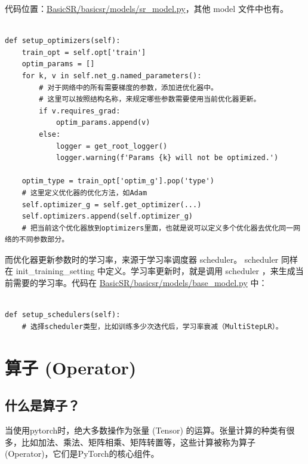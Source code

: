 \documentclass[../main.tex]{subfiles}
\begin{document}
代码位置：\href{https://github.com/XPixelGroup/BasicSR/blob/master/basicsr/models/sr_model.py}{BasicSR/basicsr/models/sr\_model.py}，其他 model 文件中也有。

\begin{verbatim}

def setup_optimizers(self):
    train_opt = self.opt['train']
    optim_params = []
    for k, v in self.net_g.named_parameters():
        # 对于网络中的所有需要梯度的参数，添加进优化器中。
        # 这里可以按照结构名称，来规定哪些参数需要使用当前优化器更新。
        if v.requires_grad:
            optim_params.append(v)
        else:
            logger = get_root_logger()
            logger.warning(f'Params {k} will not be optimized.')

    optim_type = train_opt['optim_g'].pop('type')
    # 这里定义优化器的优化方法，如Adam
    self.optimizer_g = self.get_optimizer(...)
    self.optimizers.append(self.optimizer_g)
    # 把当前这个优化器放到optimizers里面，也就是说可以定义多个优化器去优化同一网络的不同参数部分。
\end{verbatim}

而优化器更新参数时的学习率，来源于学习率调度器 scheduler。 scheduler 同样在 init\_training\_setting 中定义。学习率更新时，就是调用 scheduler ，来生成当前需要的学习率。代码在 \href{https://github.com/XPixelGroup/BasicSR/blob/master/basicsr/models/base_model.py}{BasicSR/basicsr/models/base\_model.py} 中：

\begin{verbatim}

def setup_schedulers(self):
    # 选择scheduler类型，比如训练多少次迭代后，学习率衰减（MultiStepLR）。
\end{verbatim}



\section{算子 (Operator)}

\subsection{什么是算子？}

当使用pytorch时，绝大多数操作为张量 (Tensor) 的运算。张量计算的种类有很多，比如加法、乘法、矩阵相乘、矩阵转置等，这些计算被称为算子 (Operator)，它们是PyTorch的核心组件。
\end{document}
